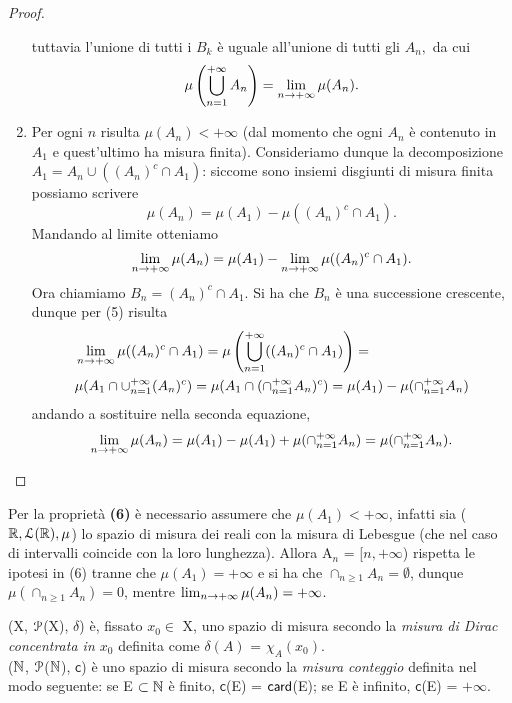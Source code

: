 \documentclass[Completo.tex]{subfiles}
\begin{document}
\begin{proof}
\begin{enumerate}
			tuttavia l'unione di tutti i $B_k$ è uguale all'unione di tutti gli $A_n,$ da cui
			\begin{equation*}
			\mu\left(\bigcup_{n =1}^{+\infty} A_n\right) = \lim_{n \rightarrow +\infty} \mu(A_n).
			\end{equation*}
			\item Per ogni $n$ risulta $\mu(A_n) < +\infty$ (dal momento che ogni $A_n$ è contenuto in $A_1$ e quest'ultimo ha misura finita). Consideriamo dunque la decomposizione $A_1 = A_n \cup ((A_n)^{c}\cap A_1)$: siccome sono insiemi disgiunti di misura finita possiamo scrivere
			\begin{equation*}
			\mu(A_n) = \mu(A_1) - \mu((A_n)^{c}\cap A_1).
			\end{equation*}
			Mandando al limite otteniamo
			\begin{equation*}
			\lim_{n \rightarrow +\infty} \mu(A_n) = \mu(A_1) - \lim_{n \rightarrow +\infty} \mu((A_n)^{c}\cap A_1).
			\end{equation*}
			Ora chiamiamo $B_n = (A_n)^{c} \cap A_1$. Si ha che $B_n$ è una successione crescente, dunque per (5) risulta
			\begin{align*}
			& \lim_{n \rightarrow +\infty} \mu((A_n)^{c}\cap A_1) = \mu\left( \bigcup_{n =1}^{+\infty} ((A_n)^{c} \cap A_1)\right) = \\
			& \mu(A_1 \cap \cup_{n=1}^{+\infty}(A_n)^{c}) = \mu(A_1 \cap (\cap_{n=1}^{+\infty} A_n)^{c}) = \mu(A_1) - \mu(\cap_{n=1}^{+\infty} A_n)
			\end{align*}
			andando a sostituire nella seconda equazione,
			\begin{equation*}
			\lim_{n \rightarrow +\infty} \mu(A_n) = \mu(A_1) - \mu(A_1) + \mu(\cap_{n=1}^{+\infty} A_n) = \mu(\cap_{n=1}^{+\infty} A_n).
			\end{equation*}
		\end{enumerate}
	\end{proof}
	\begin{Oss}
		Per la proprietà \textbf{(6)} è necessario assumere che $\mu(A_1) < +\infty$, infatti sia ($\bb[R], \eu[L](\bb[R]), \mu$) lo spazio di misura dei reali con la misura di Lebesgue (che nel caso di intervalli coincide con la loro lunghezza). Allora A$_n$ = [$n, +\infty$) rispetta le ipotesi in (6) tranne che $\mu(A_1) = +\infty$ e si ha che $\cap_{n\geq1}A_n = \emptyset$, dunque $\mu(\cap_{n\geq1}A_n) = 0$, mentre $\lim_{n \rightarrow +\infty} \mu(A_n) = +\infty$.
	\end{Oss}
	\begin{Ex}
		(X, $\eu[P]$(X), $\delta$) è, fissato $x_0 \in$ X, uno spazio di misura secondo la \textit{misura di Dirac concentrata in $x_0$} definita come $\delta(A)$ = $\chi_A(x_0)$. \\
		($\bb[N]$, $\eu[P]$($\bb[N]$), $\mathsf{c}$) è uno spazio di misura secondo la \textit{misura conteggio} definita nel modo seguente: se E $\sset \bb[N]$ è finito, $\mathsf{c}$(E) = $\sf[card]$(E); se E è infinito, $\mathsf{c}$(E) = $+\infty$.
	\end{Ex}
	
\end{document}

